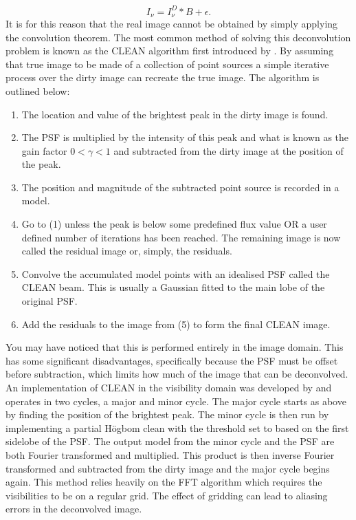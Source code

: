 \begin{equation}
\label{eq:int_convolutionnoise}
I_\nu = I_\nu^D \ast B + \epsilon.
\end{equation}
It is for this reason that the real image cannot be obtained by simply applying the convolution theorem.  The most common method of solving this deconvolution problem is known as the CLEAN algorithm first introduced by \cite{Hogbom1974}. By assuming that true image to be made of a collection of point sources a simple iterative process over the dirty image can recreate the true image. The algorithm is outlined below:
\begin{enumerate}
\item The location and value of the brightest peak in the dirty image is found.
\item The PSF is multiplied by the intensity of this peak and what is known as the gain factor $0 < \gamma < 1$ and subtracted from the dirty image at the position of the peak.
\item The position and magnitude of the subtracted point source is recorded in a model.
\item Go to (1) unless the peak is below some predefined flux value OR a user defined number of iterations has been reached. The remaining image is now called the residual image or, simply, the residuals. 
\item Convolve the accumulated model points with an idealised PSF called the CLEAN beam. This is usually a Gaussian fitted to the main lobe of the original PSF.
\item Add the residuals to the image from (5) to form the final CLEAN image.
\end{enumerate}
You may have noticed that this is performed entirely in the image domain. This has some significant disadvantages, specifically because the PSF must be offset before subtraction, which limits how much of the image that can be deconvolved. An implementation of CLEAN in the visibility domain was developed by \cite{Clark1980} and operates in two cycles, a major and minor cycle. The major cycle starts as above by finding the position of the brightest peak. The minor cycle is then run by implementing a partial H\"ogbom clean with the threshold set to based on the first sidelobe of the PSF. The output model from the minor cycle and the PSF are both Fourier transformed and multiplied. This product is then inverse Fourier transformed and subtracted from the dirty image and the major cycle begins again. This method relies heavily on the FFT algorithm which requires the visibilities to be on a regular grid. The effect of gridding can lead to aliasing errors in the deconvolved image. 

